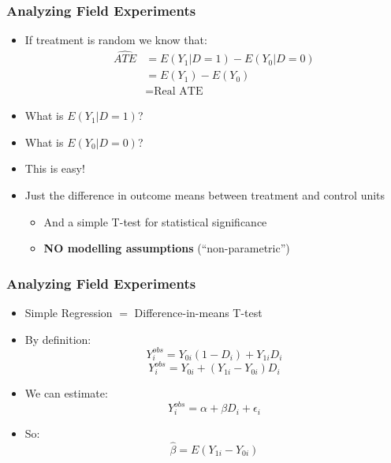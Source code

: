 \documentclass[xcolor=x11names,compress]{beamer}\usepackage[]{graphicx}\usepackage[]{color}
\renewcommand{\(}{\begin{columns}}
\renewcommand{\)}{\end{columns}}
\newcommand{\<}[1]{\begin{column}{#1}}
\renewcommand{\>}{\end{column}}
\begin{document}
\begin{frame}
\frametitle{Analyzing Field Experiments}
\begin{itemize}
\item If treatment is random we know that:
\begin{eqnarray}
\hat{ATE} &= E(Y_1|D=1) - E(Y_0|D=0) \\
& = E(Y_1) - E(Y_0) \\
& = \text{Real ATE}
\end{eqnarray}
\pause
\item What is $E(Y_1|D=1)$? 
\pause 
\item What is $E(Y_0|D=0)$?
\pause
\item This is easy! 
\pause
\item Just the difference in outcome means between treatment and control units
\pause
\begin{itemize}
\item And a simple T-test for statistical significance
\pause
\item \textbf{NO modelling assumptions} (``non-parametric'')
\end{itemize}
\end{itemize}
\end{frame}

\begin{frame}
\frametitle{Analyzing Field Experiments}
\begin{itemize}
\item Simple Regression $=$ Difference-in-means T-test
\pause
\item By definition: 
$$Y^{obs}_i = Y_{0i}(1-D_i) + Y_{1i}D_i$$
$$Y^{obs}_i = Y_{0i} + (Y_{1i} - Y_{0i}) D_i$$
\pause
\item We can estimate:
$$Y^{obs}_i = \alpha + \beta D_i + \epsilon_i$$
\pause
\item So:
$$\hat{\beta} = E(Y_{1i} - Y_{0i})$$
\end{itemize}
\end{frame}
\end{document}

